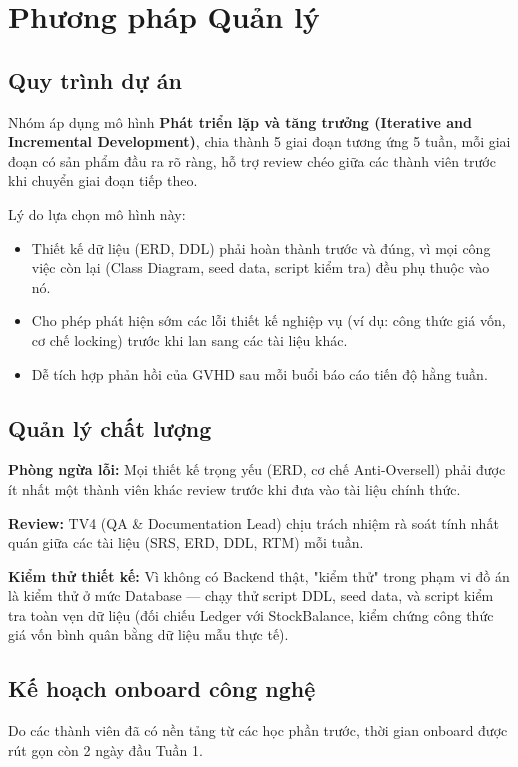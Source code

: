 \section{Phương pháp Quản lý}
\subsection{Quy trình dự án}
Nhóm áp dụng mô hình \textbf{Phát triển lặp và tăng trưởng (Iterative and Incremental Development)}, chia thành 5 giai đoạn tương ứng 5 tuần, mỗi giai đoạn có sản phẩm đầu ra rõ ràng, hỗ trợ review chéo giữa các thành viên trước khi chuyển giai đoạn tiếp theo.

Lý do lựa chọn mô hình này:
\begin{itemize}
    \item Thiết kế dữ liệu (ERD, DDL) phải hoàn thành trước và đúng, vì mọi công việc còn lại (Class Diagram, seed data, script kiểm tra) đều phụ thuộc vào nó.
    \item Cho phép phát hiện sớm các lỗi thiết kế nghiệp vụ (ví dụ: công thức giá vốn, cơ chế locking) trước khi lan sang các tài liệu khác.
    \item Dễ tích hợp phản hồi của GVHD sau mỗi buổi báo cáo tiến độ hằng tuần.
\end{itemize}

\subsection{Quản lý chất lượng}
\textbf{Phòng ngừa lỗi:} Mọi thiết kế trọng yếu (ERD, cơ chế Anti-Oversell) phải được ít nhất một thành viên khác review trước khi đưa vào tài liệu chính thức.

\textbf{Review:} TV4 (QA \& Documentation Lead) chịu trách nhiệm rà soát tính nhất quán giữa các tài liệu (SRS, ERD, DDL, RTM) mỗi tuần.

\textbf{Kiểm thử thiết kế:} Vì không có Backend thật, "kiểm thử" trong phạm vi đồ án là kiểm thử ở mức Database — chạy thử script DDL, seed data, và script kiểm tra toàn vẹn dữ liệu (đối chiếu Ledger với StockBalance, kiểm chứng công thức giá vốn bình quân bằng dữ liệu mẫu thực tế).

\subsection{Kế hoạch onboard công nghệ}
Do các thành viên đã có nền tảng từ các học phần trước, thời gian onboard được rút gọn còn 2 ngày đầu Tuần 1.

